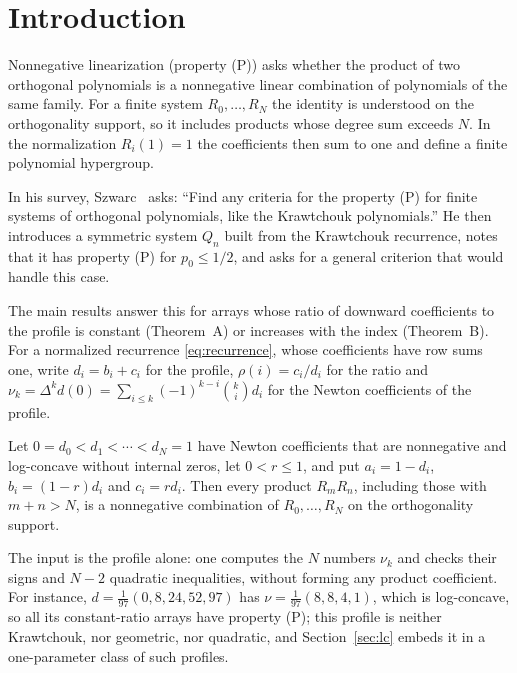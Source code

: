 \vskip50pt
\baselineskip=13.5pt
\section{Introduction}\label{sec:introduction}

Nonnegative linearization (property (P)) asks whether the product of two orthogonal polynomials is a nonnegative linear combination of polynomials of the same family. For a finite system $R_0,\ldots,R_N$ the identity is understood on the orthogonality support, so it includes products whose degree sum exceeds $N$. In the normalization $R_i(1)=1$ the coefficients then sum to one and define a finite polynomial hypergroup.

In his survey, Szwarc~\cite[\S5, Problem~2]{szwarc} asks: ``Find any criteria for the property (P) for finite systems of orthogonal polynomials, like the Krawtchouk polynomials.'' He then introduces a symmetric system $Q_n$ built from the Krawtchouk recurrence, notes that it has property (P) for $p_0\leq1/2$, and asks for a general criterion that would handle this case.

The main results answer this for arrays whose ratio of downward coefficients to the profile is constant (Theorem~A) or increases with the index (Theorem~B). For a normalized recurrence \eqref{eq:recurrence}, whose coefficients have row sums one, write $d_i=b_i+c_i$ for the profile, $\rho(i)=c_i/d_i$ for the ratio and $\nu_k=\Delta^kd(0)=\sum_{i\leq k}(-1)^{k-i}\binom kid_i$ for the Newton coefficients of the profile.

\begin{mainthm}
Let $0=d_0<d_1<\cdots<d_N=1$ have Newton coefficients that are nonnegative and log-concave without internal zeros, let $0<r\leq1$, and put $a_i=1-d_i$, $b_i=(1-r)d_i$ and $c_i=rd_i$. Then every product $R_mR_n$, including those with $m+n>N$, is a nonnegative combination of $R_0,\ldots,R_N$ on the orthogonality support.
\end{mainthm}

The input is the profile alone: one computes the $N$ numbers $\nu_k$ and checks their signs and $N-2$ quadratic inequalities, without forming any product coefficient. For instance, $d=\frac1{97}(0,8,24,52,97)$ has $\nu=\frac1{97}(8,8,4,1)$, which is log-concave, so all its constant-ratio arrays have property (P); this profile is neither Krawtchouk, nor geometric, nor quadratic, and Section~\ref{sec:lc} embeds it in a one-parameter class of such profiles.

